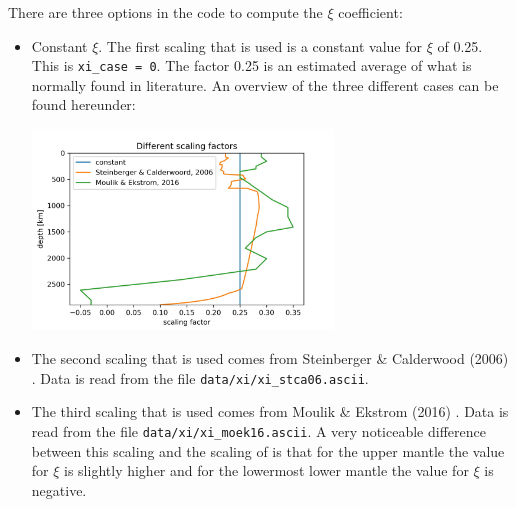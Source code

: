There are three options in the code to compute the $\xi$ coefficient:
\begin{itemize}
\item Constant $\xi$. The first scaling that is used is a constant value for $\xi$ of 0.25. 
This is \texttt{xi\_case = 0}. The factor 0.25 is an estimated average of what is normally found in 
literature. An overview of the three different cases can be found hereunder:

\begin{center}
\includegraphics[width=8cm]{python_codes/fieldstone_71/images/xi}
\end{center}

\item The second scaling that is used comes from Steinberger \& Calderwood (2006) \cite{stca06}. 
Data is read from the file \texttt{data/xi/xi\_stca06.ascii}. 

\item The third scaling that is used comes from Moulik \& Ekstrom (2016) \cite{moek16}. 
Data is read from the file \texttt{data/xi/xi\_moek16.ascii}. 
A very noticeable difference between this scaling and the scaling of \cite{stca06} 
is that for the upper mantle the value for $\xi$ is slightly higher and for the lowermost lower mantle 
the value for $\xi$ is negative.
\end{itemize}




